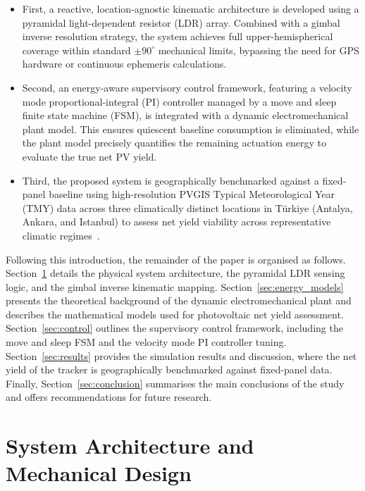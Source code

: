 \documentclass[preprint,3p,12pt]{elsarticle}
\newcommand{\degr}{^{\circ}}
\begin{document}
\begin{itemize}
    \item First, a reactive, location-agnostic kinematic
    architecture is developed using a pyramidal light-dependent resistor
    (LDR) array. Combined with a gimbal inverse resolution strategy,
    the system achieves full upper-hemispherical coverage within
    standard $\pm90\degr$ mechanical limits, bypassing the need for
    GPS hardware or continuous ephemeris calculations.

    \item Second, an energy-aware supervisory control
    framework, featuring a velocity mode proportional-integral (PI)
    controller managed by a move and sleep finite state machine (FSM),
    is integrated with a dynamic electromechanical plant model. This
    ensures quiescent baseline consumption is eliminated, while the
    plant model precisely quantifies the remaining actuation energy to
    evaluate the true net PV yield.

    \item Third, the proposed system is geographically
    benchmarked against a fixed-panel baseline using high-resolution
    PVGIS Typical Meteorological Year (TMY) data across three
    climatically distinct locations in Türkiye (Antalya, Ankara,
    and Istanbul) to assess net yield viability across representative
    climatic regimes~\cite{PVGIS2023}.
\end{itemize}


Following this introduction, the remainder of the paper is organised as follows. Section~\ref{sec:design} details the physical system architecture, the pyramidal LDR sensing logic, and the gimbal inverse kinematic mapping. Section~\ref{sec:energy_models} presents the theoretical background of the dynamic electromechanical plant and describes the mathematical models used for photovoltaic net yield assessment. Section~\ref{sec:control} outlines the supervisory control framework, including the move and sleep FSM and the velocity mode PI controller tuning. Section~\ref{sec:results} provides the simulation results and discussion, where the net yield of the tracker is geographically benchmarked against fixed-panel data. Finally, Section~\ref{sec:conclusion} summarises the main conclusions of the study and offers recommendations for future research.

\section{System Architecture and Mechanical Design}
\label{sec:design}
\end{document}
